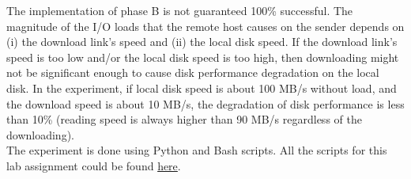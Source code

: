 The implementation of phase B is not guaranteed 100\% successful. 
The magnitude of the I/O loads that the remote host causes on the sender depends on (i) the download link's speed 
and (ii) the local disk speed. If the download link's speed is too low 
and/or the local disk speed is too high, then downloading might not be significant 
enough to cause disk performance degradation on the local disk. In the 
experiment, if local disk speed is about 100 MB/s without load, and 
the download speed is about 10 MB/s, the degradation of disk performance is 
less than 10\% (reading speed is always higher than 90 MB/s regardless of 
the downloading).\\

The experiment is done using Python and Bash scripts. 
All the scripts for this lab assignment could be found 
\href{https://github.com/binhqnguyen/cs6480/tree/master/lab2/phase2\_3}{here}. 


